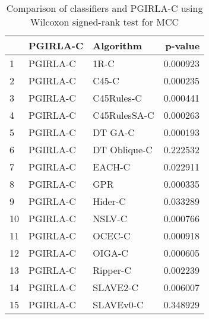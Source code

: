 \begin{table}
\footnotesize
\caption{Comparison of classifiers and PGIRLA-C using Wilcoxon signed-rank test for MCC}
\label{tab:PGIRLA-C wilcoxon MCC comparison}
\begin{tabular}{lllr}
\hline
 & PGIRLA-C & Algorithm & p-value \\
\hline
1 & PGIRLA-C & 1R-C & 0.000923 \\
2 & PGIRLA-C & C45-C & 0.000235 \\
3 & PGIRLA-C & C45Rules-C & 0.000441 \\
4 & PGIRLA-C & C45RulesSA-C & 0.000263 \\
5 & PGIRLA-C & DT GA-C & 0.000193 \\
6 & PGIRLA-C & DT Oblique-C & 0.222532 \\
7 & PGIRLA-C & EACH-C & 0.022911 \\
8 & PGIRLA-C & GPR & 0.000335 \\
9 & PGIRLA-C & Hider-C & 0.033289 \\
10 & PGIRLA-C & NSLV-C & 0.000766 \\
11 & PGIRLA-C & OCEC-C & 0.000918 \\
12 & PGIRLA-C & OIGA-C & 0.000605 \\
13 & PGIRLA-C & Ripper-C & 0.002239 \\
14 & PGIRLA-C & SLAVE2-C & 0.006007 \\
15 & PGIRLA-C & SLAVEv0-C & 0.348929 \\
\hline
\end{tabular}
\end{table}
